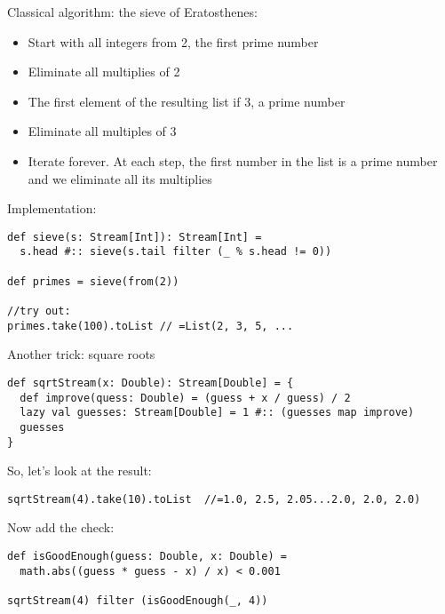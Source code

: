 \documentclass{scrartcl}
\begin{document}
Classical algorithm: the sieve of Eratosthenes:
\begin{itemize}
\item Start with all integers from 2, the first prime number
\item Eliminate all multiplies of 2
\item The first element of the resulting list if 3, a prime number
\item Eliminate all multiples of 3
\item Iterate forever. At each step, the first number in the list is a prime
  number and we eliminate all its multiplies
\end{itemize}
Implementation:
\begin{lstlisting}
def sieve(s: Stream[Int]): Stream[Int] = 
  s.head #:: sieve(s.tail filter (_ % s.head != 0))

def primes = sieve(from(2))

//try out:
primes.take(100).toList // =List(2, 3, 5, ...
\end{lstlisting}

Another trick: square roots
\begin{lstlisting}
def sqrtStream(x: Double): Stream[Double] = {
  def improve(quess: Double) = (guess + x / guess) / 2
  lazy val guesses: Stream[Double] = 1 #:: (guesses map improve)
  guesses
}
\end{lstlisting}
So, let's look at the result:
\begin{lstlisting}
sqrtStream(4).take(10).toList  //=1.0, 2.5, 2.05...2.0, 2.0, 2.0)
\end{lstlisting}
Now add the check:
\begin{lstlisting}
def isGoodEnough(guess: Double, x: Double) = 
  math.abs((guess * guess - x) / x) < 0.001

sqrtStream(4) filter (isGoodEnough(_, 4))
\end{lstlisting}

\end{document}
